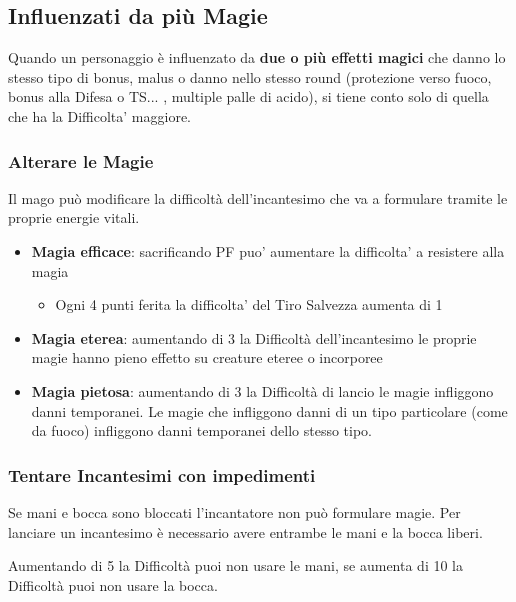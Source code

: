 \begin{multicols}{2}
\subsection{Influenzati da più Magie}

Quando un personaggio è influenzato da \textbf{due o più effetti magici} che danno lo stesso tipo di bonus, malus o danno nello stesso round (protezione verso fuoco, bonus alla Difesa o TS... , multiple palle di acido), si tiene conto solo di quella che ha la Difficolta' maggiore.

\subsubsection{Alterare le Magie}

Il mago può modificare la difficoltà dell'incantesimo che va a formulare tramite le proprie energie vitali.

\begin{itemize}
	\item
	\textbf{Magia efficace}: sacrificando PF puo’ aumentare la difficolta’ a resistere alla magia
		\begin{itemize}
		\item Ogni 4 punti ferita la difficolta’ del Tiro Salvezza aumenta di 1
		\end{itemize}
	\item
	\textbf{Magia eterea}: aumentando di 3 la Difficoltà dell'incantesimo le proprie magie hanno pieno effetto su creature eteree o incorporee
	\item
	\textbf{Magia pietosa}: aumentando di 3 la Difficoltà di lancio le magie infliggono danni temporanei. 
	Le magie che infliggono danni di un tipo particolare (come da fuoco) infliggono danni temporanei dello stesso tipo.
\end{itemize}

\subsubsection{Tentare Incantesimi con impedimenti} 

Se mani e bocca sono bloccati l'incantatore non può formulare magie. Per lanciare un incantesimo è necessario avere entrambe le mani e la bocca liberi.

Aumentando di 5 la Difficoltà puoi non usare le mani, se aumenta di 10 la Difficoltà puoi non usare la bocca.


\end{multicols}
